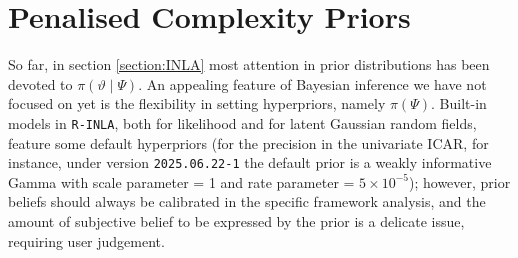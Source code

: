 \documentclass[openany, 11pt, oneside]{book}
\begin{document}






\section{Penalised Complexity Priors} \label{section:PC_INLA}

So far, in section \ref{section:INLA} most attention in prior distributions has been devoted to $\pi(\vartheta \mid \Psi)$. An appealing feature of Bayesian inference we have not focused on yet is the flexibility in setting hyperpriors, namely $\pi(\Psi)$. Built-in models in \texttt{R-INLA}, both for likelihood and for latent Gaussian random fields, feature some default hyperpriors (for the precision in the univariate ICAR, for instance, under version \texttt{2025.06.22-1} the default prior is a weakly informative Gamma with scale parameter = 1 and rate parameter = $5\times10^{-5}$); however, prior beliefs should always be calibrated in the specific framework analysis, and the amount of subjective belief to be expressed by the prior is a delicate issue, requiring user judgement. 
\end{document}
